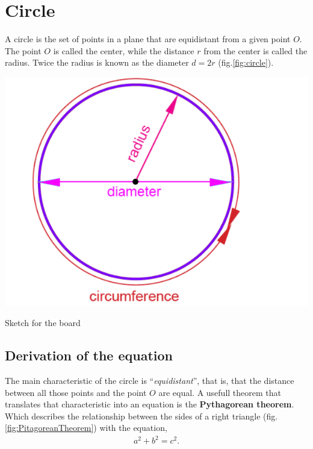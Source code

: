 \documentclass[../main-notes.tex]{subfiles}
\begin{document}
\section{Circle}

A circle is the set of points in a plane that are equidistant from a given point $O$.
The point $O$ is called the center, while the distance $r$ from the center is called the radius.
Twice the radius is known as the diameter $d=2 r$ (fig.\ref{fig:circle}).

\begin{marginfigure}
    \centering
    \includegraphics[width=\textwidth]{../Figures/circunference/circle.jpeg}
    \caption{Sketch for the board}\label{fig:circle}
\end{marginfigure}

\subsection{Derivation of the equation}

The main characteristic of the circle is ``\textit{equidistant}'', that is, that the distance between all those points and the point $O$ are equal.
A usefull theorem that translates that characteristic into an equation is the \textbf{Pythagorean theorem}.
Which describes the relationship between the sides of a right triangle (fig.\ref{fig:PitagoreanTheorem}) with the equation,
\begin{gather*}
    a^2 + b^2 = c^2.
\end{gather*}
\end{document}
